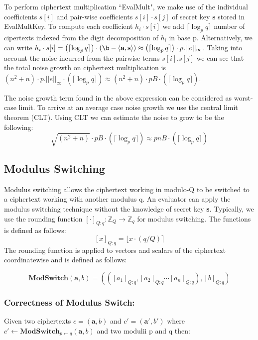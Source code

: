 \documentclass[10pt,journal,compsoc]{IEEEtran}
\theoremstyle{definition}
\begin{document}
To perform ciphertext multiplication ``EvalMult", we make use of the individual coefficients $s[i]$ and pair-wise coefficients $s[i]\cdot s[j]$ of secret key $\textbf{s}$ stored in EvalMultKey. To compute each coefficient $h_i \cdot s[i]$ we add $\lceil \log_p q \rceil$ number of cipertexts indexed from the digit decomposition of $h_i$ in base p. Alternatively, we can write $h_i\cdot s[i] = \left(\lceil \log_p q \rceil\right)\cdot \left(\b - \langle \textbf{a},\textbf{s} \rangle\right) \approx \left(\lceil \log_p q \rceil\right)\cdot p.||e||_\infty$. Taking into account the noise incurred from the pairwise terms $s[i].s[j]$ we can see that the total noise growth on ciphertext multiplication is $\left(n^2 + n\right)\cdot p.||e||_\infty \cdot \left(\lceil \log_p q \rceil\right) \approx \left(n^2 + n\right)\cdot pB \cdot \left(\lceil \log_p q \rceil\right)$.

The noise growth term found in the above expression can be considered as worst-case limit. To arrive at an average case noise growth we use the central limit theorem (CLT). Using CLT we can estimate the noise to grow to be the following:
$$\sqrt{\left( n^2+n\right)}\cdot pB \cdot \left(\lceil \log_p q \rceil\right) \approx pnB \cdot \left(\lceil \log_p q \rceil\right)$$   


\subsection{Modulus Switching}

Modulus switching allows the ciphertext working in modulo-Q to be switched to a ciphertext working with another modulus q. An evaluator can apply the modulus switching technique without the knowledge of secret key \textbf{s}. Typically, we use the rounding function $[\cdot]_{Q:q}:\mathbb{Z}_Q \rightarrow \mathbb{Z}_q$ for modulus switching. The functions is defined as follows:
$$[x]_{Q:q} = \lfloor x\cdot (q/Q)\rceil$$
The rounding function is applied to vectors and scalars of the ciphertext coordinatewise and is defined as follows:

$$\textbf{ModSwitch}\left(\textbf{a},b\right) = \left(\left([a_1]_{Q:q},[a_2]_{Q:q}\cdots[a_n]_{Q:q}\right),[b]_{Q:q}\right)$$

\subsubsection{\textbf{Correctness of Modulus Switch}:}

Given two ciphertexts $c = \left(\textbf{a},b\right)$ and $c' = \left(\textbf{a}',b'\right)$ where $c' \leftarrow \textbf{ModSwitch}_{p\leftarrow q}\left(\textbf{a},b\right)$ and two modulii p and q then:
\end{document}
